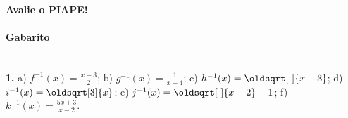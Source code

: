 \documentclass[a4paper,12pt]{article}
\renewcommand*{\sqrt}[2][\ ]{\oldsqrt[#1]{#2}}
\begin{document}
\vspace*{5cm}
\begin{center}
    \textbf{Avalie o PIAPE!}
    
    \vspace*{1cm}

\end{center}


\vspace*{\fill}
{\footnotesize \color{darkgray}
\paragraph*{Gabarito} \hspace*{\fill}\\
\textbf{1.} a) $f^{-1}(x) = \frac{x-3}{2}$; b) $g^{-1}(x) = \frac{1}{x-4}$; c) $h^{-1}(x) = \sqrt{x-3}$; d) $i^{-1}(x) = \sqrt[3]{x}$; e) $j^{-1}(x) = \sqrt{x-2} - 1 $; f) $k^{-1}(x) = \frac{5x + 3}{x - 2}$.
}
\end{document}

